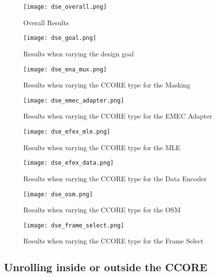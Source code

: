 \begin{figure}
    \centering
    \texttt{[image: dse\_overall.png]}
    \caption{Overall Results}
    \label{fig:dse-overall}
    \centering
    \texttt{[image: dse\_goal.png]}
    \caption{Results when varying the design goal}
    \label{fig:dse-goal}
\end{figure}
\begin{figure}
    \centering
    \texttt{[image: dse\_ena\_mux.png]}
    \caption{Results when varying the CCORE type for the Masking}
    \label{fig:dse-ena-mux}
    \centering
    \texttt{[image: dse\_emec\_adapter.png]}
    \caption{Results when varying the CCORE type for the EMEC Adapter}
    \label{fig:dse-emec-adapter}
\end{figure}
\begin{figure}
    \centering
    \texttt{[image: dse\_efex\_mle.png]}
    \caption{Results when varying the CCORE type for the MLE}
    \label{fig:dse-efex-mle}    
    \centering
    \texttt{[image: dse\_efex\_data.png]}
    \caption{Results when varying the CCORE type for the Data Encoder}
    \label{fig:dse-efex-data}
\end{figure}
\begin{figure}
    \centering
    \texttt{[image: dse\_osm.png]}
    \caption{Results when varying the CCORE type for the OSM}
    \label{fig:dse-osm}
    \centering
    \texttt{[image: dse\_frame\_select.png]}
    \caption{Results when varying the CCORE type for the Frame Select}
    \label{fig:dse-frame-select}
\end{figure}






\subsection{Unrolling inside or outside the CCORE}








